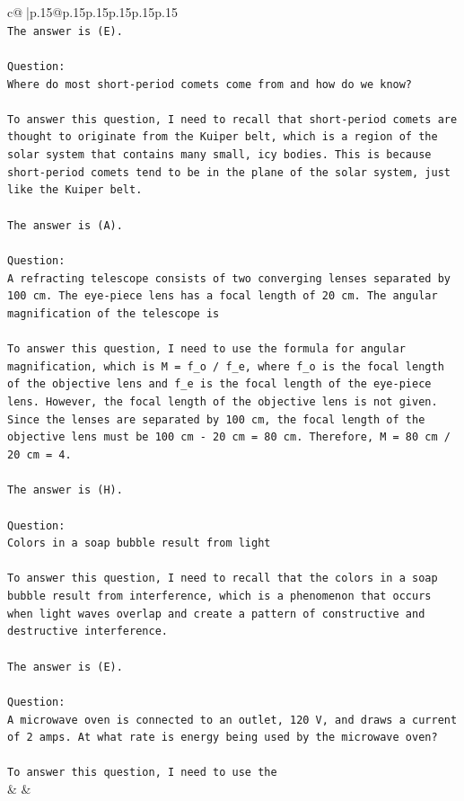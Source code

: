 \documentclass{article}
\begin{document}
{\begin{supertabular}{c@{$\;$}|p{.15\linewidth}@{}p{.15\linewidth}p{.15\linewidth}p{.15\linewidth}p{.15\linewidth}p{.15\linewidth}}
{{{\\ 
\texttt{The answer is (E).} \\
\\ 
\texttt{Question:} \\
\texttt{Where do most short{-}period comets come from and how do we know?} \\
\\ 
\texttt{To answer this question, I need to recall that short{-}period comets are thought to originate from the Kuiper belt, which is a region of the solar system that contains many small, icy bodies. This is because short{-}period comets tend to be in the plane of the solar system, just like the Kuiper belt.} \\
\\ 
\texttt{The answer is (A).} \\
\\ 
\texttt{Question:} \\
\texttt{A refracting telescope consists of two converging lenses separated by 100 cm. The eye{-}piece lens has a focal length of 20 cm. The angular magnification of the telescope is} \\
\\ 
\texttt{To answer this question, I need to use the formula for angular magnification, which is M = f\_o / f\_e, where f\_o is the focal length of the objective lens and f\_e is the focal length of the eye{-}piece lens. However, the focal length of the objective lens is not given. Since the lenses are separated by 100 cm, the focal length of the objective lens must be 100 cm {-} 20 cm = 80 cm. Therefore, M = 80 cm / 20 cm = 4.} \\
\\ 
\texttt{The answer is (H).} \\
\\ 
\texttt{Question:} \\
\texttt{Colors in a soap bubble result from light} \\
\\ 
\texttt{To answer this question, I need to recall that the colors in a soap bubble result from interference, which is a phenomenon that occurs when light waves overlap and create a pattern of constructive and destructive interference.} \\
\\ 
\texttt{The answer is (E).} \\
\\ 
\texttt{Question:} \\
\texttt{A microwave oven is connected to an outlet, 120 V, and draws a current of 2 amps. At what rate is energy being used by the microwave oven?} \\
\\ 
\texttt{To answer this question, I need to use the} \\
            }
        }
    }
    & & \\ \\


\end{supertabular}}
\end{document}
